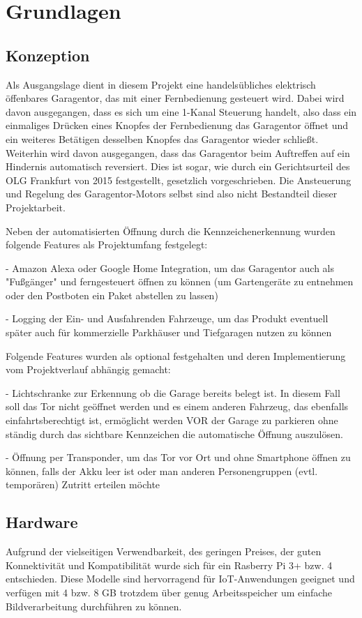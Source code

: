 \chapter{Grundlagen}
\section{Konzeption}
Als Ausgangslage dient in diesem Projekt eine handelsübliches elektrisch öffenbares Garagentor, das mit einer Fernbedienung gesteuert wird. Dabei wird davon ausgegangen, dass es sich um eine 1-Kanal Steuerung handelt, also dass ein einmaliges Drücken eines Knopfes der Fernbedienung das Garagentor öffnet und ein weiteres Betätigen desselben Knopfes das Garagentor wieder schließt. Weiterhin wird davon ausgegangen, dass das Garagentor beim Auftreffen auf ein Hindernis automatisch reversiert. Dies ist sogar, wie durch ein Gerichtsurteil des OLG Frankfurt von 2015 festgestellt, gesetzlich vorgeschrieben. %
Die Ansteuerung und Regelung des Garagentor-Motors selbst sind also nicht Bestandteil dieser Projektarbeit.

Neben der automatisierten Öffnung durch die Kennzeichenerkennung wurden folgende Features als Projektumfang festgelegt:

- Amazon Alexa oder Google Home Integration, um das Garagentor auch als "Fußgänger" und ferngesteuert öffnen zu können (um Gartengeräte zu entnehmen oder den Postboten ein Paket abstellen zu lassen)

- Logging der Ein- und Ausfahrenden Fahrzeuge, um das Produkt eventuell später auch für kommerzielle Parkhäuser und Tiefgaragen nutzen zu können

Folgende Features wurden als optional festgehalten und deren Implementierung vom Projektverlauf abhängig gemacht:

- Lichtschranke zur Erkennung ob die Garage bereits belegt ist. In diesem Fall soll das Tor nicht geöffnet werden und es einem anderen Fahrzeug, das ebenfalls einfahrtsberechtigt ist, ermöglicht werden VOR der Garage zu parkieren ohne ständig durch das sichtbare Kennzeichen die automatische Öffnung auszulösen.

- Öffnung per Transponder, um das Tor vor Ort und ohne Smartphone öffnen zu können, falls der Akku leer ist oder man anderen Personengruppen (evtl. temporären) Zutritt erteilen möchte


\section{Hardware}
Aufgrund der vielseitigen Verwendbarkeit, des geringen Preises, der guten Konnektivität und Kompatibilität wurde sich für ein Rasberry Pi 3+ bzw. 4 entschieden. Diese Modelle sind hervorragend für IoT-Anwendungen geeignet und verfügen mit 4 bzw. 8 GB trotzdem über genug Arbeitsspeicher um einfache Bildverarbeitung durchführen zu können. 

